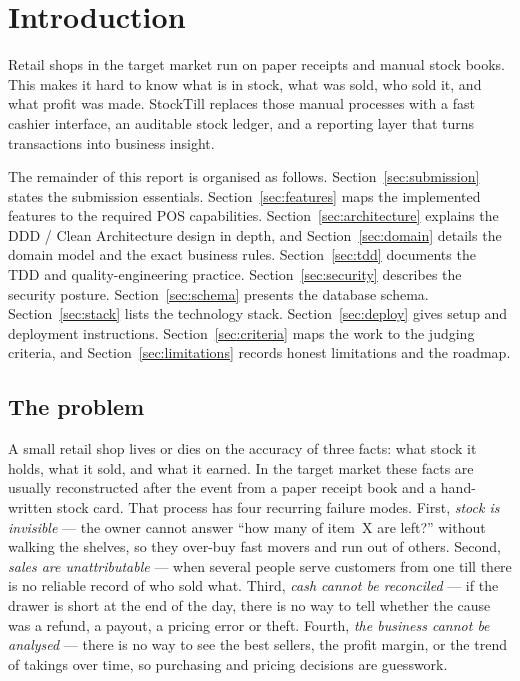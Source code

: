 \documentclass[11pt,a4paper]{article}
\begin{document}
\tableofcontents
\newpage

\section{Introduction}
\label{sec:intro}

Retail shops in the target market run on paper receipts and manual stock books. This makes it
hard to know what is in stock, what was sold, who sold it, and what profit was made. StockTill
replaces those manual processes with a fast cashier interface, an auditable stock ledger, and a
reporting layer that turns transactions into business insight.

The remainder of this report is organised as follows. Section~\ref{sec:submission} states the
submission essentials. Section~\ref{sec:features} maps the implemented features to the required
POS capabilities. Section~\ref{sec:architecture} explains the DDD / Clean Architecture design in
depth, and Section~\ref{sec:domain} details the domain model and the exact business rules.
Section~\ref{sec:tdd} documents the TDD and quality-engineering practice. Section~\ref{sec:security}
describes the security posture. Section~\ref{sec:schema} presents the database schema. Section~\ref{sec:stack}
lists the technology stack. Section~\ref{sec:deploy} gives setup and deployment instructions.
Section~\ref{sec:criteria} maps the work to the judging criteria, and Section~\ref{sec:limitations}
records honest limitations and the roadmap.

\subsection{The problem}

A small retail shop lives or dies on the accuracy of three facts: what stock it holds, what it
sold, and what it earned. In the target market these facts are usually reconstructed after the
event from a paper receipt book and a hand-written stock card. That process has four recurring
failure modes. First, \emph{stock is invisible} --- the owner cannot answer ``how many of item~X are
left?'' without walking the shelves, so they over-buy fast movers and run out of others. Second,
\emph{sales are unattributable} --- when several people serve customers from one till there is no
reliable record of who sold what. Third, \emph{cash cannot be reconciled} --- if the drawer is short
at the end of the day, there is no way to tell whether the cause was a refund, a payout, a pricing
error or theft. Fourth, \emph{the business cannot be analysed} --- there is no way to see the best
sellers, the profit margin, or the trend of takings over time, so purchasing and pricing decisions
are guesswork.
\end{document}
